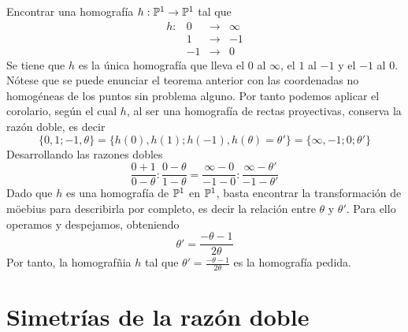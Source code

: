 \begin{exa}
	Encontrar una homografía $h:\mathbb{P}^1\rightarrow \mathbb{P}^1$ tal que 
	\begin{equation*}
		\begin{array}{cccc}
		h:&0&\rightarrow &\infty\\
		&1&\rightarrow &-1\\
		&-1&\rightarrow &0
		\end{array}
	\end{equation*}
	Se tiene que $h$ es la única homografía que lleva el $0$ al $\infty$, el $1$ al $-1$ y el $-1$ al $0$. Nótese que se puede enunciar el teorema anterior con las coordenadas no homogéneas de los puntos sin problema alguno. Por tanto podemos aplicar el corolario, según el cual $h$, al ser una homografía de rectas proyectivas, conserva la razón doble, es decir
	\begin{equation*}
		\{0,1;-1,\theta\}=\{h(0),h(1);h(-1),h(\theta)=\theta'\}=\{\infty,-1;0;\theta'\}
	\end{equation*}
	Desarrollando las razones dobles
	\begin{equation*}
		\frac{0+1}{0-\theta}:\frac{0-\theta}{1-\theta}=\frac{\infty-0}{-1-0}:\frac{\infty-\theta'}{-1-\theta'}
	\end{equation*}
	Dado que $h$ es una homografía de $\mathbb{P}^1$ en $\mathbb{P}^1$, basta encontrar la transformación de möebius para describirla por completo, es decir la relación entre $\theta$ y $\theta'$. Para ello operamos y despejamos, obteniendo
	\begin{equation*}
		\theta'=\frac{-\theta-1}{2\theta}
	\end{equation*}
	Por tanto, la homografñia $h$ tal que $\theta'=\frac{-\theta-1}{2\theta}$ es la homografía pedida.
\end{exa}

\section{Simetrías de la razón doble}
